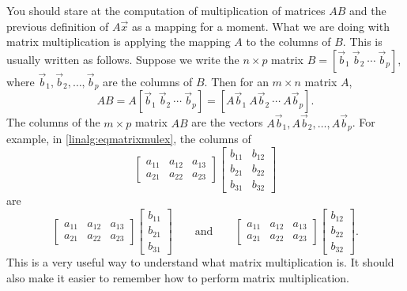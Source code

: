 You should stare at the computation of multiplication of matrices $AB$
and
the previous definition of $A\vec{x}$ as a mapping
for a moment.
What we are doing with matrix multiplication is applying
the mapping $A$ to the columns of $B$.  This is usually written as follows.
Suppose we write the $n \times p$ matrix
$B = [ \vec{b}_1 ~ \vec{b}_2 ~ \cdots ~ \vec{b}_p ]$, where
$\vec{b}_1, \vec{b}_2, \ldots, \vec{b}_p$ are the columns of $B$.  Then
for an $m \times n$ matrix $A$,
\begin{equation*}
AB =
A [ \vec{b}_1 ~ \vec{b}_2 ~ \cdots ~ \vec{b}_p ]
=
[ A\vec{b}_1 ~ A\vec{b}_2 ~ \cdots ~ A\vec{b}_p ] .
\end{equation*}
The columns of the $m \times p$ matrix $AB$
are the
vectors $A\vec{b}_1, A\vec{b}_2, \ldots, A\vec{b}_p$.
For example, in \eqref{linalg:eqmatrixmulex},
the columns of
\begin{equation*}
\begin{bmatrix}
a_{11} & a_{12} & a_{13} \\
a_{21} & a_{22} & a_{23}
\end{bmatrix}
\begin{bmatrix}
b_{11} & b_{12} \\
b_{21} & b_{22} \\
b_{31} & b_{32}
\end{bmatrix}
\end{equation*}
are
\begin{equation*}
\begin{bmatrix}
a_{11} & a_{12} & a_{13} \\
a_{21} & a_{22} & a_{23}
\end{bmatrix}
\begin{bmatrix}
b_{11} \\
b_{21} \\
b_{31}
\end{bmatrix}
\qquad
\text{and}
\qquad
\begin{bmatrix}
a_{11} & a_{12} & a_{13} \\
a_{21} & a_{22} & a_{23}
\end{bmatrix}
\begin{bmatrix}
b_{12} \\
b_{22} \\
b_{32}
\end{bmatrix} .
\end{equation*}
This is a very useful way to understand what matrix multiplication is.
It should also make it easier to remember how to perform matrix multiplication.

